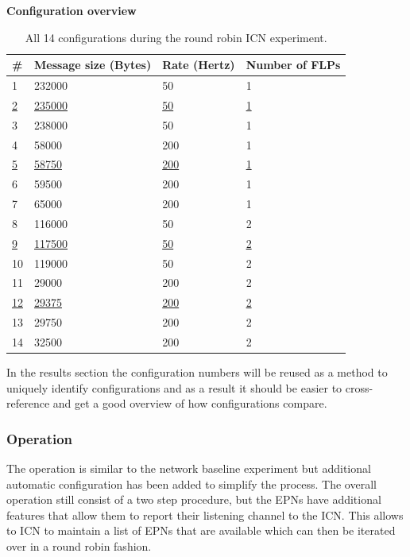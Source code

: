\documentclass[]{article}
\begin{document}
\begin{table}[H]
	\textbf{Configuration overview}	
	\begin{center}
		\begin{tabular}{ | l | l | l | l | }
			\hline
			\textbf{\#} & \textbf{Message size (Bytes)} & \textbf{Rate (Hertz)} & \textbf{Number of FLPs} \\ \hline
			
			1 & 232000 & 50 & 1 \\ \hline
			\underline{2} & \underline{235000} & \underline{50} & \underline{1} \\ \hline
			3 & 238000 & 50 & 1 \\ \hline
			4 & 58000 & 200 & 1 \\ \hline
			\underline{5} & \underline{58750} & \underline{200} & \underline{1} \\ \hline
			6 & 59500 & 200 & 1 \\ \hline
			7 & 65000 & 200 & 1 \\ \hline
			8 & 116000 & 50 & 2 \\ \hline
			\underline{9} & \underline{117500} & \underline{50} & \underline{2} \\ \hline
			10 & 119000 & 50 & 2 \\ \hline
			11 & 29000 & 200 & 2 \\ \hline
			\underline{12} & \underline{29375} & \underline{200} & \underline{2} \\ \hline
			13 & 29750 & 200 & 2 \\ \hline
			14 & 32500 & 200 & 2 \\ \hline
		\end{tabular}
		\caption{All 14 configurations during the round robin ICN experiment.}
		\label{tab:configoverviewround}
	\end{center}
\end{table}

In the results section the configuration numbers will be reused as a method to uniquely identify configurations and as a result it should be easier to cross-reference and get a good overview of how configurations compare.

\subsubsection{Operation}
The operation is similar to the network baseline experiment but additional automatic configuration has been added to simplify the process. The overall operation still consist of a two step procedure, but the EPNs have additional features that allow them to report their listening channel to the ICN. This allows to ICN to maintain a list of EPNs that are available which can then be iterated over in a round robin fashion.
\end{document}
